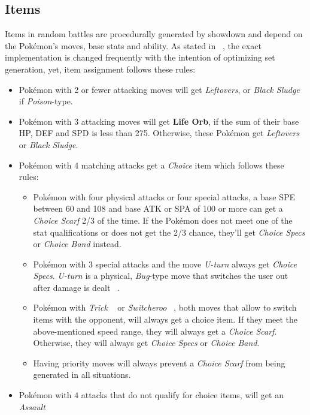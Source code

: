 \subsection{Items}
\label{sec:randbats-items}
Items in random battles are procedurally generated by showdown and depend on the Pokémon's
moves, base stats and ability. As stated in ~\autocite{Smogon:RandBatsGuide}, the exact implementation
is \grqq changed frequently with the intention of optimizing set generation\grqq, yet, item
assignment follows these rules:
\begin{itemize}
	\item Pokémon with 2 or fewer attacking moves will get \textit{Leftovers}, or 
	\textit{Black Sludge} if \textit{Poison}-type.
	\item Pokémon with 3 attacking moves will get \textbf{Life Orb}, if the sum of their base
	\ac{HP}, \ac{DEF} and \ac{SPD} is less than 275. Otherwise, these Pokémon get 
	\textit{Leftovers} or \textit{Black Sludge}.
	\item Pokémon with 4 matching attacks get a \textit{Choice} item which follows these rules:
	\begin{itemize}
		\item Pokémon with four physical attacks or four special attacks, a base \ac{SPE} between
		60 and 108 and base \ac{ATK} or \ac{SPA} of 100 or more can get a \textit{Choice Scarf}
		2/3 of the time. If the Pokémon does not meet one of the stat qualifications or does not
		get the 2/3 chance, they'll get \textit{Choice Specs} or \textit{Choice Band} instead.
		\item Pokémon with 3 special attacks and the move \textit{U-turn} always get 
		\textit{Choice Specs}. \textit{U-turn} is a physical, \textit{Bug}-type move that 
		switches the user out after damage is dealt ~\autocite{Bulbapedia:UTurn}.
		\item Pokémon with \textit{Trick} ~\autocite{Bulbapedia:Trick} or \textit{Switcheroo} 
		~\autocite{Bulbapedia:Switcheroo}, both moves that allow to switch items
		with the opponent, will always get a choice item. If they meet the above-mentioned 
		speed range, they will always get a \textit{Choice Scarf}. Otherwise, they will always
		get \textit{Choice Specs} or \textit{Choice Band}.
		\item Having priority moves will always prevent a \textit{Choice Scarf} from being 
		generated in all situations.
	\end{itemize}
	\item Pokémon with 4 attacks that do not qualify for choice items, will get an \textit{Assault
}
\end{itemize}
